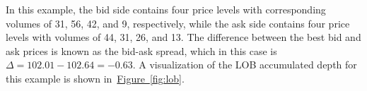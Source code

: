 \begin{table}[H]
    \centering
    \caption{Bid (left) and Ask (right) sides of a Limit Order Book (LOB) $L$}
    \label{tab:lob}
\end{table}

In this example, the bid side contains four price levels with corresponding volumes of 31, 56, 42, and 9, respectively,
while the ask side contains four price levels with volumes of 44, 31, 26, and 13.
The difference between the best bid and ask prices is known as the bid-ask spread, which in this case is $\Delta = 102.01 - 102.64 = -0.63$.
A visualization of the LOB accumulated depth for this example is shown in~\hyperref[fig:lob]{Figure~\ref{fig:lob}}.


